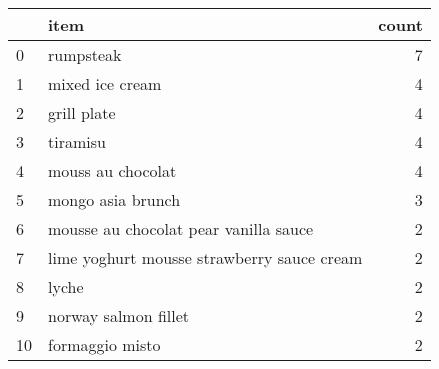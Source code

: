 \begin{tabular}{llr}
\toprule
{} &                                               item &  count \\
\midrule
0   &                                          rumpsteak &      7 \\
1   &                                    mixed ice cream &      4 \\
2   &                                        grill plate &      4 \\
3   &                                           tiramisu &      4 \\
4   &                                  mouss au chocolat &      4 \\
5   &                                  mongo asia brunch &      3 \\
6   &              mousse au chocolat pear vanilla sauce &      2 \\
7   &         lime yoghurt mousse strawberry sauce cream &      2 \\
8   &                                              lyche &      2 \\
9   &                               norway salmon fillet &      2 \\
10  &                                    formaggio misto &      2 \\
\bottomrule
\end{tabular}
